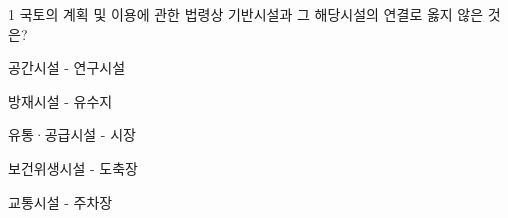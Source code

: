 \begin{question}{1}
국토의 계획 및 이용에 관한 법령상 기반시설과 그 해당시설의 연결로 옳지 않은 것은?
\begin{choices}
  \item 공간시설 - 연구시설
  \item 방재시설 - 유수지
  \item 유통·공급시설 - 시장
  \item 보건위생시설 - 도축장
  \item 교통시설 - 주차장
\end{choices}
\end{question}
